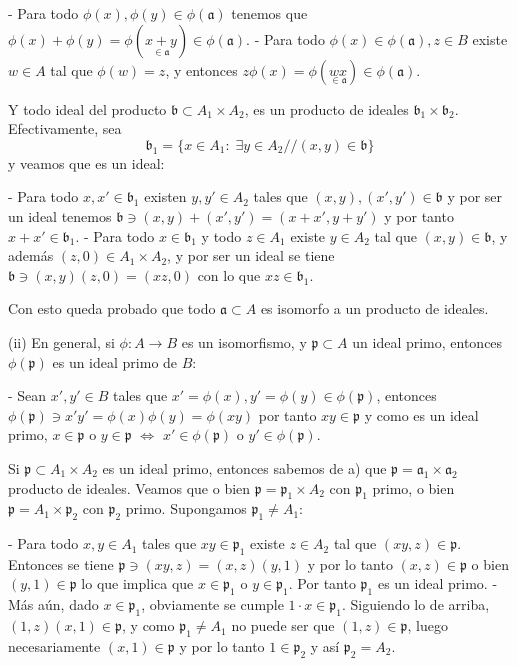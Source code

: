 \documentclass[../main.tex]{subfiles}
\begin{document}
- Para todo $\phi(x),\phi(y)\in \phi(\mathfrak a)$ tenemos que $\phi(x)+\phi(y) = \phi(\underset{\in \mathfrak a}{x+y}) \in \phi(\mathfrak a)$.
- Para todo $\phi(x)\in \phi(\mathfrak a),z\in B$ existe $w\in A$ tal que $\phi(w) = z$, y entonces $z\phi(x) = \phi(\underset{\in \mathfrak a}{wx}) \in \phi(\mathfrak a)$.

Y todo ideal del producto $\mathfrak b \subset A_1\times A_2$, es un producto de ideales $\mathfrak b_1 \times \mathfrak b_2$. Efectivamente, sea
$$
\mathfrak b_1 = \{x\in A_1: \; \exists y\in A_2//(x,y)\in \mathfrak b\}
$$
y veamos que es un ideal:

- Para todo $x, x' \in \mathfrak b_1$ existen $y,y' \in A_2$ tales que $(x,y),(x',y')\in \mathfrak b$ y por ser un ideal tenemos $\mathfrak b \ni (x,y)+(x',y') = (x+x',y+y')$ y por tanto $x+x' \in \mathfrak b_1$.
- Para todo $x\in \mathfrak b_1$ y todo $z\in A_1$ existe $y\in A_2$ tal que $(x,y)\in \mathfrak b$, y además $(z,0)\in A_1\times A_2$, y por ser un ideal se tiene $\mathfrak b\ni (x,y)(z,0) = (xz,0)$ con lo que $xz \in \mathfrak b_1$.

Con esto queda probado que todo $\mathfrak a \subset A$ es isomorfo a un producto de ideales.

(ii) En general, si $\phi:A\to B$ es un isomorfismo, y $\mathfrak p \subset A$ un ideal primo, entonces $\phi(\mathfrak p)$ es un ideal primo de $B$:

- Sean $x',y' \in B$ tales que $x' = \phi(x), y' = \phi(y)\in \phi(\mathfrak p)$, entonces $\phi(\mathfrak p) \ni x'y' = \phi(x)\phi(y) = \phi(xy) $ por tanto $xy\in \mathfrak p$ y como es un ideal primo, $x \in \mathfrak p$ o $y\in \mathfrak p$ $\iff$ $x' \in \phi(\mathfrak p)$ o $y' \in \phi(\mathfrak p)$.

Si $\mathfrak p \subset A_1\times A_2$ es un ideal primo, entonces sabemos de a)  que $\mathfrak p = \mathfrak a_1\times \mathfrak a_2$ producto de ideales. Veamos que o bien $\mathfrak p = \mathfrak p_1\times A_2$ con $\mathfrak p_1$ primo, o bien $\mathfrak p = A_1\times \mathfrak p_2$ con $\mathfrak p_2$ primo. Supongamos $\mathfrak p_1 \neq A_1$:

- Para todo $x,y \in A_1$ tales que $xy\in \mathfrak p_1$  existe $z\in A_2$ tal que $(xy,z)\in \mathfrak p$. Entonces se tiene $\mathfrak p \ni (xy,z) = (x,z)(y,1)$ y por lo tanto $(x,z)\in \mathfrak p$ o bien $(y,1)\in \mathfrak p$ lo que implica que $x\in \mathfrak p_1$ o $y \in \mathfrak p_1$. Por tanto $\mathfrak p_1$ es un ideal primo.
- Más aún, dado $x\in \mathfrak p_1$, obviamente se cumple $1\cdot x \in \mathfrak p_1$. Siguiendo lo de arriba, $(1,z)(x,1) \in \mathfrak p$, y como $\mathfrak p_1\neq A_1$ no puede ser que $(1,z)\in \mathfrak p$, luego necesariamente $(x,1)\in \mathfrak p$ y por lo tanto $1\in\mathfrak p_2$ y así $\mathfrak p_2 = A_2$.
\end{document}
